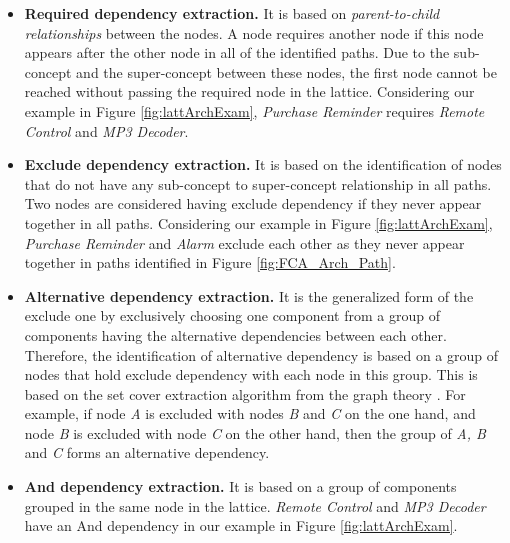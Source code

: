 \documentclass[graybox]{svmult}
\begin{document}
\begin{itemize}

\item \textbf{Required dependency extraction.} It is based on \textit{parent-to-child relationships} between the nodes. A node requires another node if this node appears after the other node in all of the identified paths. Due to the sub-concept and the super-concept between these nodes, the first node cannot be reached without passing the required node in the lattice. Considering our example in Figure \ref{fig:lattArchExam}, \textit{Purchase Reminder} requires \textit{Remote Control} and \textit{MP3 Decoder}. 


\item \textbf{Exclude dependency extraction.} It is based on the identification of nodes that do not have any sub-concept to super-concept relationship in all paths.  Two nodes are considered having exclude dependency if they never appear together in all paths. Considering our example in Figure \ref{fig:lattArchExam}, \textit{Purchase Reminder} and \textit{Alarm} exclude each other as they never appear together in paths identified in Figure \ref{fig:FCA_Arch_Path}. 

\item \textbf{Alternative dependency extraction.} It is the generalized form of the exclude one by exclusively choosing one component from a group of components having the alternative dependencies between each other. Therefore, the identification of alternative dependency is based on a group of nodes that hold exclude dependency with each node in this group. This is based on the set cover extraction algorithm from the graph theory \cite{cormen2009introduction}.  {For example, if node \textit{A} is excluded with nodes \textit{B} and \textit{C} on the one hand, and node \textit{B} is excluded with node \textit{C} on the other hand, then the group of \textit{A, B} and \textit{C} forms an alternative dependency.} 

\item \textbf{And dependency extraction.} It is based on a group of components grouped in the same node in the lattice. \textit{Remote Control} and \textit{MP3 Decoder} have an And dependency in our example in Figure \ref{fig:lattArchExam}. 



\end{itemize}
\end{document}
